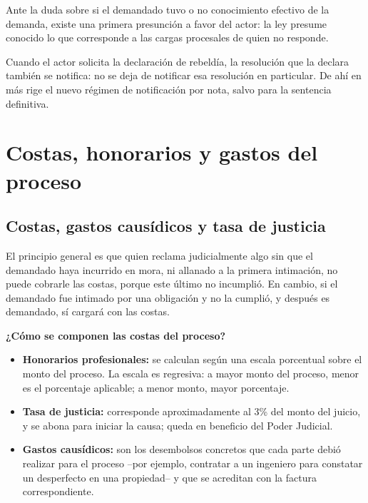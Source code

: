 \documentclass[12pt,oneside]{book}
\begin{document}
Ante la duda sobre si el demandado tuvo o no conocimiento efectivo de la demanda, existe una primera presunción a favor del actor: la ley presume conocido lo que corresponde a las cargas procesales de quien no responde.

\begin{note}
Cuando el actor solicita la declaración de rebeldía, la resolución que la declara también se notifica: no se deja de notificar esa resolución en particular. De ahí en más rige el nuevo régimen de notificación por nota, salvo para la sentencia definitiva.
\end{note}

\chapter{Costas, honorarios y gastos del proceso}

\section{Costas, gastos causídicos y tasa de justicia}

El principio general es que quien reclama judicialmente algo sin que el demandado haya incurrido en mora, ni allanado a la primera intimación, no puede cobrarle las costas, porque este último no incumplió. En cambio, si el demandado fue intimado por una obligación y no la cumplió, y después es demandado, sí cargará con las costas.

\begin{important}
\textbf{¿Cómo se componen las costas del proceso?}
\begin{itemize}
    \item \textbf{Honorarios profesionales:} se calculan según una escala porcentual sobre el monto del proceso. La escala es regresiva: a mayor monto del proceso, menor es el porcentaje aplicable; a menor monto, mayor porcentaje.
    \item \textbf{Tasa de justicia:} corresponde aproximadamente al 3\% del monto del juicio, y se abona para iniciar la causa; queda en beneficio del Poder Judicial.
    \item \textbf{Gastos causídicos:} son los desembolsos concretos que cada parte debió realizar para el proceso --por ejemplo, contratar a un ingeniero para constatar un desperfecto en una propiedad-- y que se acreditan con la factura correspondiente.
\end{itemize}
\end{important}
\end{document}

